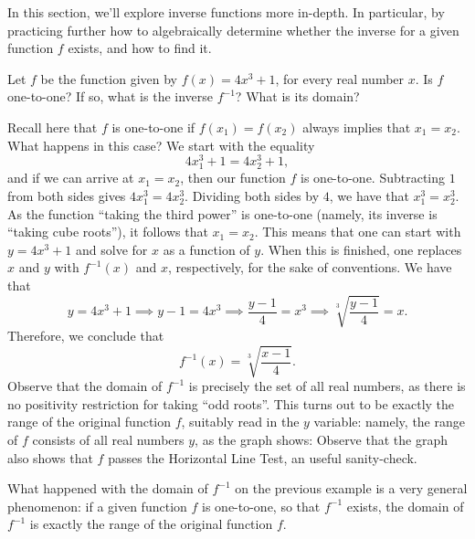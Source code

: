 \documentclass[nooutcomes]{ximera}
\begin{document}
In this section, we'll explore inverse functions more in-depth. In particular, by practicing further how to algebraically determine whether the inverse for a given function $f$ exists, and how to find it.

\begin{example}
  Let $f$ be the function given by $f(x) = 4x^3+1$, for every real number $x$. Is $f$ one-to-one? If so, what is the inverse $f^{-1}$? What is its domain?

  \begin{explanation}
    Recall here that $f$ is one-to-one if $f(x_1) = f(x_2)$ always implies that $x_1=x_2$. What happens in this case? We start with the equality $$4x_1^3+1 = 4x_2^3+1,$$ and if we can arrive at $x_1=x_2$, then our function $f$ is one-to-one. Subtracting $1$ from both sides gives $4x_1^3=4x_2^3$. Dividing both sides by $4$, we have that $x_1^3 = x_2^3$. As the function ``taking the third power'' is one-to-one (namely, its inverse is ``taking cube roots''), it follows that $x_1=x_2$. This means that one can start with $y=4x^3+1$ and solve for $x$ as a function of $y$. When this is finished, one replaces $x$ and $y$ with $f^{-1}(x)$ and $x$, respectively, for the sake of conventions. We have that $$y=4x^3+1 \implies y-1 = 4x^3 \implies \frac{y-1}{4} = x^3 \implies \sqrt[3]{\frac{y-1}{4}} = x.$$Therefore, we conclude that $$f^{-1}(x) = \sqrt[3]{\frac{x-1}{4}}.$$Observe that the domain of $f^{-1}$ is precisely the set of all real numbers, as there is no positivity restriction for taking ``odd roots''. This turns out to be exactly the range of the original function $f$, suitably read in the $y$ variable: namely, the range of $f$ consists of all real numbers $y$, as the graph shows:
Observe that the graph also shows that $f$ passes the Horizontal Line Test, an useful sanity-check.
  \end{explanation}
\end{example}

\begin{callout}
  What happened with the domain of $f^{-1}$ on the previous example is a very general phenomenon: if a given function $f$ is one-to-one, so that $f^{-1}$ exists, the domain of $f^{-1}$ is exactly the range of the original function $f$.
\end{callout}
\end{document}
